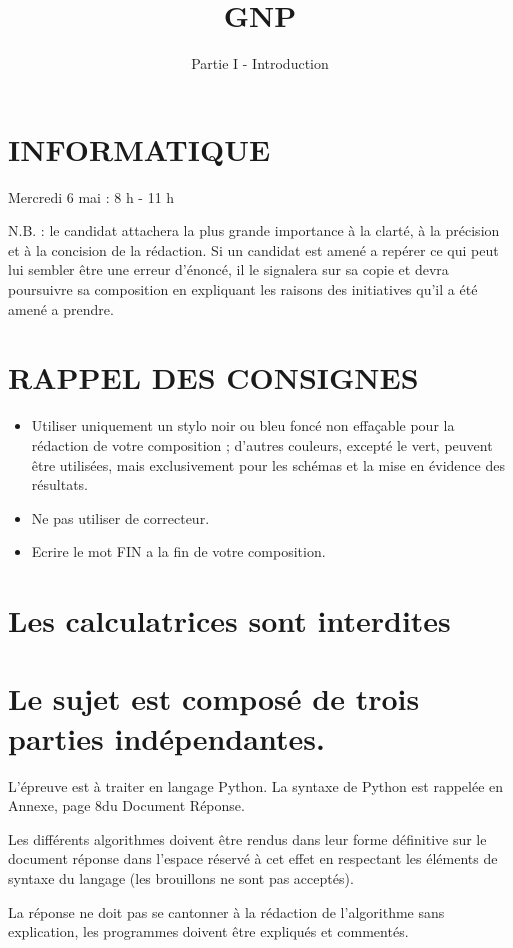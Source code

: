\documentclass[10pt]{article}
\title{GNP }
\author{Partie I - Introduction}
\date{}
\begin{document}
\maketitle


\section*{INFORMATIQUE }
Mercredi 6 mai : 8 h - 11 h

N.B. : le candidat attachera la plus grande importance à la clarté, à la précision et à la concision de la rédaction. Si un candidat est amené a repérer ce qui peut lui sembler être une erreur d'énoncé, il le signalera sur sa copie et devra poursuivre sa composition en expliquant les raisons des initiatives qu'il a été amené a prendre.

\section{RAPPEL DES CONSIGNES}
\begin{itemize}
  \item Utiliser uniquement un stylo noir ou bleu foncé non effaçable pour la rédaction de votre composition ; d'autres couleurs, excepté le vert, peuvent être utilisées, mais exclusivement pour les schémas et la mise en évidence des résultats.

  \item Ne pas utiliser de correcteur.

  \item Ecrire le mot FIN a la fin de votre composition.

\end{itemize}
\section{Les calculatrices sont interdites}
\section{Le sujet est composé de trois parties indépendantes.}
L'épreuve est à traiter en langage Python. La syntaxe de Python est rappelée en Annexe, page $8 \mathrm{du}$ Document Réponse.

Les différents algorithmes doivent être rendus dans leur forme définitive sur le document réponse dans l'espace réservé à cet effet en respectant les éléments de syntaxe du langage (les brouillons ne sont pas acceptés).

La réponse ne doit pas se cantonner à la rédaction de l'algorithme sans explication, les programmes doivent être expliqués et commentés.
\end{document}
